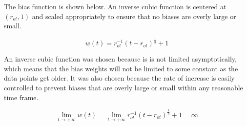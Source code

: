 The bias function is shown below. An inverse cubic function is centered at $(r_{ot},1)$ and scaled appropriately to ensure that no biases are overly large or small.

\begin{equation}
    w\left(t\right)=r_{ot}^{-1}\left(t-r_{ot}\right)^{\frac{1}{3}}+1
\end{equation}

An inverse cubic function was chosen because is is not limited asymptotically, which means that the bias weights will not be limited to some constant as the data points get older. It was also chosen because the rate of increase is easily controlled to prevent biases that are overly large or small within any reasonable time frame.

\begin{equation*}
    \lim_{t \to +\infty}w(t)=
    \lim_{t \to +\infty}r_{ot}^{-1}\left(t-r_{ot}\right)^{\frac{1}{3}}+1=\infty
\end{equation*}